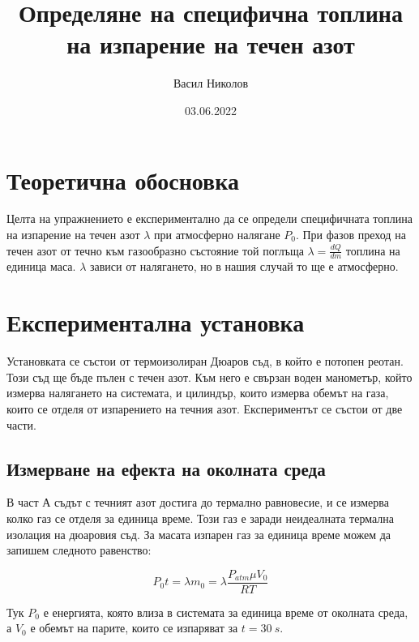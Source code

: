 \documentclass[%
 reprint,
 amsmath,amssymb,
 aps,
]{revtex4-2}
\begin{document}
\setlength{\abovedisplayskip}{3pt}
\setlength{\belowdisplayskip}{3pt}    

\title{Определяне на специфична топлина на изпарение на течен азот}
\author{Васил Николов}
\date{03.06.2022}
\maketitle

\section{Теоретична обосновка}

Целта на упражнението е експериментално да се определи специфичната топлина на изпарение на течен азот $\lambda$ при атмосферно налягане $P_0$.
При фазов преход на течен азот от течно към газообразно състояние той поглъща $\lambda = \frac{dQ}{dm}$ топлина на единица маса. $\lambda$ зависи от налягането, но в нашия случай то ще е атмосферно. 

\section{Експериментална установка}

Установката се състои от термоизолиран Дюаров съд, в който е потопен реотан. Този съд ще бъде пълен с течен азот. Към него е свързан воден манометър, който измерва налягането на системата, и цилиндър, които измерва обемът на газа, които се отделя от изпарението на течния азот. Експериментът се състои от две части. 

\subsection{Измерване на ефекта на околната среда}

В част А съдът с течният азот достига до термално равновесие, и се измерва колко газ се отделя за единица време. Този газ е заради неидеалната термална изолация на дюаровия съд. За масата изпарен газ за единица време можем да запишем следното равенство:

\begin{equation*} \label{eq:1}
    P_0 t = \lambda m_0 = \lambda \frac{P_{atm} \mu V_0}{RT} \tag{1}
\end{equation*}

Тук $P_0$ е енергията, която влиза в системата за единица време от околната среда, а $V_0$ е обемът на парите, които се изпаряват за $t=30 \ \si{s}$. 
\end{document}
